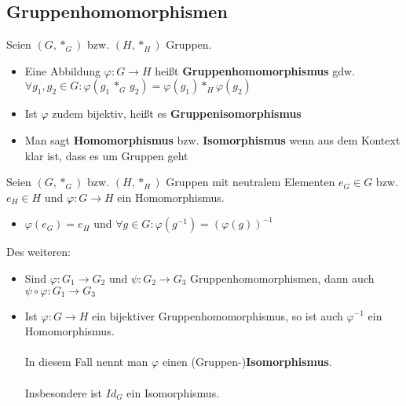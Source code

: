 \documentclass[titlepage]{article}
\newcommand{\1}{\mathbb{1}}
\newcommand{\0}{\mathbb{0}}
\begin{document}
			\subsection{Gruppenhomomorphismen}
				Seien $(G,*_G)$ bzw. $(H,*_H)$ Gruppen.
				\begin{itemize}
					\item Eine Abbildung $\varphi:G\rightarrow H$ heißt \textbf{Gruppenhomomorphismus} gdw. $\forall g_1,g_2\in G:\varphi(g_1\,*_G\,g_2)=\varphi(g_1)*_H\varphi(g_2)$
					\item Ist $\varphi$ zudem bijektiv, heißt es \textbf{Gruppenisomorphismus}\\
					\item Man sagt \textbf{Homomorphismus} bzw. \textbf{Isomorphismus} wenn aus dem Kontext klar ist, dass es um Gruppen geht
				\end{itemize}
				Seien $(G,*_G)$ bzw. $(H,*_H)$ Gruppen mit neutralem Elementen $e_G\in G$ bzw. $e_H\in H$ und $\varphi:G\rightarrow H$ ein Homomorphismus.
				\begin{itemize}
					\item $\varphi(e_G)=e_H$ und $\forall g\in G:\varphi(g^{-1})=(\varphi(g))^{-1}$
				\end{itemize}
				Des weiteren:
				\begin{itemize}
					\item Sind $\varphi:G_1\rightarrow G_2$ und $\psi:G_2\rightarrow G_3$ Gruppenhomomorphismen, dann auch $\psi\circ\varphi:G_1\rightarrow G_3$
					\item Ist $\varphi:G\rightarrow H$ ein bijektiver Gruppenhomomorphismus, so ist auch $\varphi^{-1}$ ein Homomorphismus. \\\\In diesem Fall nennt man $\varphi$ einen (Gruppen-)\textbf{Isomorphismus}. 
					\\\\Insbesondere ist $Id_G$ ein Isomorphismus.
				\end{itemize}
\end{document}
